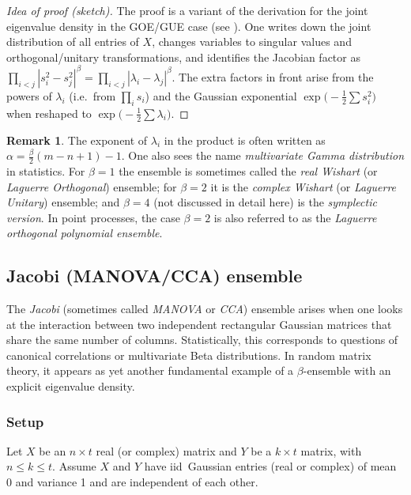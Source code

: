 \documentclass[letterpaper,11pt,oneside,reqno]{book}
\numberwithin{equation}{chapter}  %
\theoremstyle{definition}
\newtheorem{remark}[proposition]{Remark}
\begin{document}
\begin{proof}[Idea of proof (sketch)]
The proof is a variant of the derivation for the joint eigenvalue density in the GOE/GUE case (see ).  One writes down the joint distribution of all entries of \(X\), changes variables to singular values and orthogonal/unitary transformations, and identifies the Jacobian factor as
\(\prod_{i<j}|s_i^2 - s_j^2|^\beta = \prod_{i<j}| \lambda_i - \lambda_j |^\beta\).
The extra factors in front arise from the powers of \(\lambda_i\) (i.e.\ from \(\prod_i s_i\)) and the Gaussian exponential \(\exp\bigl(-\frac12\sum s_i^2\bigr)\) when reshaped to \(\exp\bigl(-\frac12\sum \lambda_i\bigr)\).
\end{proof}
\begin{remark}
The exponent of \(\lambda_i\) in the product is often written as
\(\alpha = \frac{\beta}{2}(m-n+1)-1\).  One also sees the name \emph{multivariate Gamma distribution} in statistics.  For \(\beta=1\) the ensemble is sometimes called the \emph{real Wishart} (or \emph{Laguerre Orthogonal}) ensemble; for \(\beta=2\) it is the \emph{complex Wishart} (or \emph{Laguerre Unitary}) ensemble; and \(\beta=4\) (not discussed in detail here) is the \emph{symplectic version}.
In point processes, the case $\beta=2$ is
also referred to as the \emph{Laguerre orthogonal polynomial ensemble}.
\end{remark}


\subsection{Jacobi (MANOVA/CCA) ensemble}
\label{lecture3:sec:Jacobi_MANOVA_CCA}

The \emph{Jacobi} (sometimes called \emph{MANOVA} or \emph{CCA}) ensemble arises when one looks at the interaction between two independent rectangular Gaussian matrices that share the same number of columns.  Statistically, this corresponds to questions of canonical correlations or multivariate Beta distributions.  In random matrix theory, it appears as yet another fundamental example of a \(\beta\)-ensemble with an explicit eigenvalue density.

\subsubsection{Setup}

Let \(X\) be an \(n\times t\) real (or complex) matrix and \(Y\) be a \(k\times t\) matrix, with \(n\le k \le t\).  Assume \(X\) and \(Y\) have iid\ Gaussian entries (real or complex) of mean 0 and variance 1 and are independent of each other.
\end{document}
